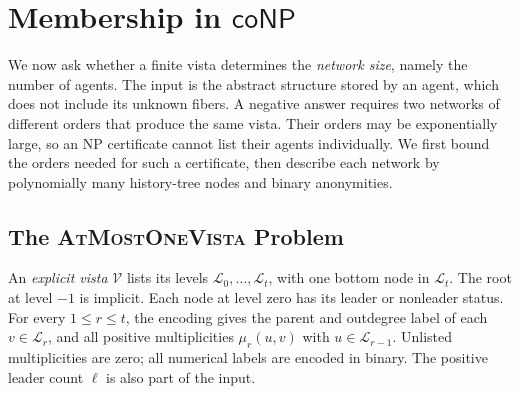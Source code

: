 \documentclass[11pt]{article}
\begin{document}
%

\section{Membership in \texorpdfstring{\(\mathsf{coNP}\)}{coNP}}
\label{app:conp-membership}

We now ask whether a finite vista determines the \emph{network size},
namely the number of agents.  The
input is the abstract structure stored by an agent, which does not include its unknown
fibers.  A negative answer requires two networks of different orders
that produce the same vista.  Their orders may be exponentially large,
so an NP certificate cannot list their agents individually.  We first
bound the orders needed for such a certificate, then describe each
network by polynomially many history-tree nodes and binary anonymities.

\subsection{The \textnormal{\textsc{AtMostOneVista}} Problem}

An \emph{explicit vista} \(\mathcal V\) lists its levels
\(\mathcal L_0,\ldots,\mathcal L_t\), with one bottom node in
\(\mathcal L_t\).  The root at level \(-1\) is implicit.  Each node
at level zero has its leader or nonleader status.  For every
\(1\leq r\leq t\), the encoding gives the parent and outdegree label
of each \(v\in\mathcal L_r\), and all positive multiplicities
\(\mu_r(u,v)\) with \(u\in\mathcal L_{r-1}\).  Unlisted
multiplicities are zero; all numerical labels are encoded in binary.
The positive leader count \(\ell\) is also part of the input.
\end{document}
